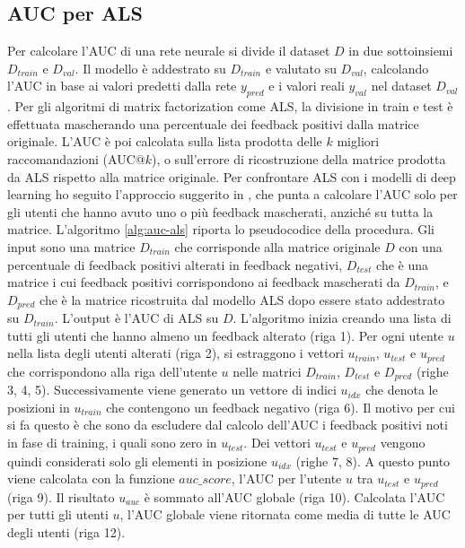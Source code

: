 \documentclass[12pt,italian]{report}
\begin{document}
\subsection{AUC per ALS}
Per calcolare l'AUC di una rete neurale si divide il dataset $D$ in due sottoinsiemi $D_{train}$ e $D_{val}$. Il modello è addestrato su $D_{train}$ e valutato su $D_{val}$, calcolando l'AUC in base ai valori predetti dalla rete $y_{pred}$ e i valori reali $y_{val}$ nel dataset $D_{val}$. Per gli algoritmi di matrix factorization come ALS, la divisione in train e test è effettuata mascherando una percentuale dei feedback positivi dalla matrice originale. L'AUC è poi calcolata sulla lista prodotta delle $k$ migliori raccomandazioni (AUC@$k$), o sull'errore di ricostruzione della matrice prodotta da ALS rispetto alla matrice originale.
Per confrontare ALS con i modelli di deep learning ho seguito l'approccio suggerito in \cite{auc-als}, che punta a calcolare l'AUC solo per gli utenti che hanno avuto uno o più feedback mascherati, anziché su tutta la matrice. 
L'algoritmo \ref{alg:auc-als} riporta lo pseudocodice della procedura. Gli input sono una matrice $D_{train}$ che corrisponde alla matrice originale $D$ con una percentuale di feedback positivi alterati in feedback negativi, $D_{test}$ che è una matrice i cui feedback positivi corrispondono ai feedback mascherati da $D_{train}$, e $D_{pred}$ che è la matrice ricostruita dal modello ALS dopo essere stato addestrato su $D_{train}$. 
L'output è l'AUC di ALS su $D$. L'algoritmo inizia creando una lista di tutti gli utenti che hanno almeno un feedback alterato (riga 1). Per ogni utente $u$ nella lista degli utenti alterati (riga 2), si estraggono i vettori $u_{train}$, $u_{test}$ e $u_{pred}$ che corrispondono alla riga dell'utente $u$ nelle matrici $D_{train}$, $D_{test}$ e $D_{pred}$ (righe 3, 4, 5). 
Successivamente viene generato un vettore di indici $u_{idx}$ che denota le posizioni in $u_{train}$ che contengono un feedback negativo (riga 6). Il motivo per cui si fa questo è che sono da escludere dal calcolo dell'AUC i feedback positivi noti in fase di training, i quali sono zero in $u_{test}$. Dei vettori $u_{test}$ e $u_{pred}$ vengono quindi considerati solo gli elementi in posizione $u_{idx}$ (righe 7, 8).
A questo punto viene calcolata con la funzione $auc\_score$, l'AUC per l'utente $u$ tra $u_{test}$ e $u_{pred}$ (riga 9). Il risultato $u_{auc}$ è sommato all'AUC globale (riga 10). Calcolata l'AUC per tutti gli utenti $u$, l'AUC globale viene ritornata come media di tutte le AUC degli utenti (riga 12).
\end{document}
